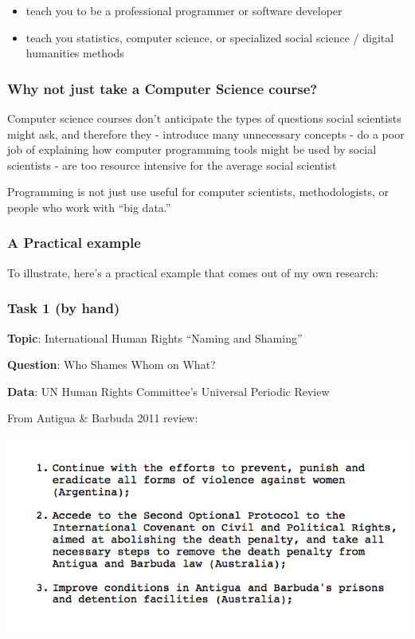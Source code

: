 \documentclass[]{book}
\providecommand{\tightlist}{%
  \setlength{\itemsep}{0pt}\setlength{\parskip}{0pt}}
\begin{document}
\begin{itemize}
\tightlist
\item
  teach you to be a professional programmer or software developer
\item
  teach you statistics, computer science, or specialized social science
  / digital humanities methods
\end{itemize}

\subsubsection*{Why not just take a Computer Science
course?}\label{why-not-just-take-a-computer-science-course}

Computer science courses don't anticipate the types of questions social
scientists might ask, and therefore they - introduce many unnecessary
concepts - do a poor job of explaining how computer programming tools
might be used by social scientists - are too resource intensive for the
average social scientist

Programming is not just use useful for computer scientists,
methodologists, or people who work with ``big data.''

\subsubsection*{A Practical example}\label{a-practical-example}

To illustrate, here's a practical example that comes out of my own
research:

\subsubsection*{Task 1 (by hand)}\label{task-1-by-hand}

\textbf{Topic}: International Human Rights ``Naming and Shaming''

\textbf{Question}: Who Shames Whom on What?

\textbf{Data}: UN Human Rights Committee's Universal Periodic Review

From Antigua \& Barbuda 2011 review:

\begin{center}\includegraphics[width=0.7\linewidth]{img/upr-text} \end{center}
\end{document}

